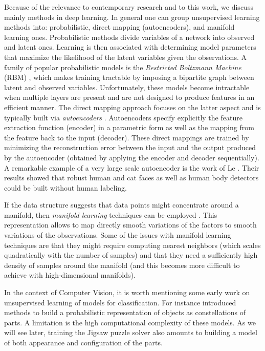 \documentclass[runningheads]{llncs}
\begin{document}
Because of the relevance to contemporary research and to this work, we discuss mainly methods in deep learning. In general one can group unsupervised learning methods into: probabilistic, direct mapping (autoencoders), and manifold learning ones. Probabilistic methods divide variables of a network into observed and latent ones. Learning is then associated with determining model parameters that maximize the likelihood of the latent variables given the observations. A family of popular probabilistic models is the \emph{Restricted Boltzmann Machine} (RBM) \cite{Smolensky86,HintonS86}, which makes training tractable by imposing a bipartite graph between latent and observed variables. 
Unfortunately, these models become intractable when multiple layers are present and are not designed to produce features in an efficient manner. The direct mapping approach focuses on the latter aspect and is typically built via \emph{autoencoders} \cite{BoulardK88,HintonZ94,OlshausenF97}. Autoencoders specify explicitly the feature extraction function (encoder) in a parametric form as well as the mapping from the feature back to the input (decoder). These direct mappings are trained by minimizing the reconstruction error between the input and the output produced by the autoencoder (obtained by applying the encoder and decoder sequentially). A remarkable example of a very large scale autoencoder is the work of Le \etal \cite{LeRMDCCDN12}. Their results showed that robust human and cat faces as well as human body detectors could be built without human labeling.

If the data structure suggests that data points might concentrate around a manifold, then \emph{manifold learning} techniques can be employed \cite{RoweisS2000,BelkinN03}. This representation allows to map directly smooth variations of the factors to smooth variations of the observations. Some of the issues with manifold learning techniques are that they might require computing nearest neighbors (which scales quadratically with the number of samples) and that they need a sufficiently high density of samples around the manifold (and this becomes more difficult to achieve with high-dimensional manifolds).

In the context of Computer Vision, it is worth mentioning some early work on unsupervised learning of models for classification. For instance \cite{Fergus2003,Weber2000} introduced methods to build a probabilistic representation of objects as constellations of parts. A limitation is the high computational complexity of these models. As we will see later, training the Jigsaw puzzle solver also amounts to building a model of both appearance and configuration of the parts.
\end{document}
